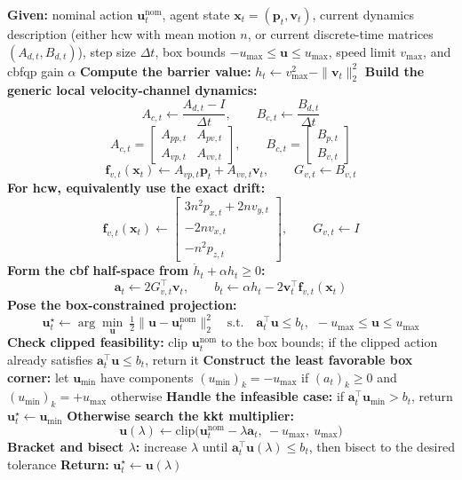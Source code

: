 \begin{algorithm}[H]
\footnotesize
\caption{Velocity \acs{cbfqp} Saturation Filter}
\label{alg:velocity-cbf-qp}
\begin{algorithmic}[1]
\State \textbf{Given:} nominal action $\mathbf{u}_t^{\mathrm{nom}}$, agent state $\mathbf{x}_t=(\mathbf{p}_t,\mathbf{v}_t)$, current dynamics description (either \acs{hcw} with mean motion $n$, or current discrete-time matrices $(A_{d,t},B_{d,t})$), step size $\Delta t$, box bounds $-u_{\max}\le \mathbf{u}\le u_{\max}$, speed limit $v_{\max}$, and \acs{cbfqp} gain $\alpha$
\State \textbf{Compute the barrier value:} $h_t \leftarrow v_{\max}^2-\|\mathbf{v}_t\|_2^2$
\State \textbf{Build the generic local velocity-channel dynamics:}
\[
A_{c,t}\leftarrow \frac{A_{d,t}-I}{\Delta t},\qquad
B_{c,t}\leftarrow \frac{B_{d,t}}{\Delta t}
\]
\[
A_{c,t} =
\begin{bmatrix}
A_{pp,t} & A_{pv,t}\\
A_{vp,t} & A_{vv,t}
\end{bmatrix},
\qquad
B_{c,t} =
\begin{bmatrix}
B_{p,t}\\
B_{v,t}
\end{bmatrix}
\]
\[
\mathbf{f}_{v,t}(\mathbf{x}_t)\leftarrow
A_{vp,t}\mathbf{p}_t + A_{vv,t}\mathbf{v}_t,
\qquad
G_{v,t}\leftarrow B_{v,t}
\]
\State \textbf{For \acs{hcw}, equivalently use the exact drift:}
\[
\mathbf{f}_{v,t}(\mathbf{x}_t)\leftarrow
\begin{bmatrix}
3n^2 p_{x,t}+2n v_{y,t}\\
-2n v_{x,t}\\
-n^2 p_{z,t}
\end{bmatrix},
\qquad
G_{v,t}\leftarrow I
\]
    \State \textbf{Form the \acs{cbf} half-space from $\dot h_t+\alpha h_t\ge 0$:}
\[
\mathbf{a}_t \leftarrow 2G_{v,t}^\top\mathbf{v}_t,
\qquad
b_t \leftarrow \alpha h_t - 2 \mathbf{v}_t^\top \mathbf{f}_{v,t}(\mathbf{x}_t)
\]
\State \textbf{Pose the box-constrained projection:}
\[
\mathbf{u}_t^\star \leftarrow
\arg\min_{\mathbf{u}}\ \tfrac12\|\mathbf{u}-\mathbf{u}_t^{\mathrm{nom}}\|_2^2
\quad\text{s.t.}\quad
\mathbf{a}_t^\top \mathbf{u} \le b_t,\ \ -u_{\max}\le \mathbf{u}\le u_{\max}
\]
\State \textbf{Check clipped feasibility:} clip $\mathbf{u}_t^{\mathrm{nom}}$ to the box bounds; if the clipped action already satisfies $\mathbf{a}_t^\top \mathbf{u} \le b_t$, return it
\State \textbf{Construct the least favorable box corner:} let $\mathbf{u}_{\min}$ have components $(u_{\min})_k=-u_{\max}$ if $(a_t)_k\ge 0$ and $(u_{\min})_k=+u_{\max}$ otherwise
\State \textbf{Handle the infeasible case:} if $\mathbf{a}_t^\top \mathbf{u}_{\min}>b_t$, return $\mathbf{u}_t^\star\leftarrow \mathbf{u}_{\min}$
\State \textbf{Otherwise search the \acs{kkt} multiplier:}
\[
\mathbf{u}(\lambda)\leftarrow \mathrm{clip}\!\big(\mathbf{u}_t^{\mathrm{nom}}-\lambda \mathbf{a}_t,\ -u_{\max},\ u_{\max}\big)
\]
\State \textbf{Bracket and bisect $\lambda$:} increase $\lambda$ until $\mathbf{a}_t^\top \mathbf{u}(\lambda)\le b_t$, then bisect to the desired tolerance
\State \textbf{Return:} $\mathbf{u}_t^\star \leftarrow \mathbf{u}(\lambda)$
\end{algorithmic}
\end{algorithm}

